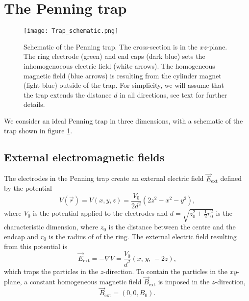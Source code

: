 \section{The Penning trap}\label{sec:penning_trap}

\begin{figure}[h!]
    \texttt{[image: Trap\_schematic.png]}
    \caption{Schematic of the Penning trap. The cross-section is in the $xz$-plane. The ring electrode (green) and end caps (dark blue) sets the inhomogenoeous electric field (white arrows). The homogeneous magnetic field (blue arrows) is resulting from the cylinder magnet (light blue) outside of the trap. For simplicity, we will assume that the trap extends the distance $d$ in all directions, see text for further details.}
    \label{fig:schematic_trap}
\end{figure}

We consider an ideal Penning trap in three dimensions, with a schematic of the trap shown in figure \ref{fig:schematic_trap}.


\subsection{External electromagnetic fields}\label{subsec_methods:penning_trap_setup}

The electrodes in the Penning trap create an external electric field $\vec{E}_\mathrm{ext}$ defined by the potential
\begin{equation}
    V (\vec{r})= V(x,y,z) = \frac{V_0}{2d^2}(2z^2 - x^2 - y^2), \label{eq:penning_potential}
\end{equation}
where $V_0$ is the potential applied to the electrodes and $d= \sqrt{z_0^2+ \frac{1}{2}r_0^2}$ is the characteristic dimension, where $z_0$ is the distance between the centre and the endcap and $r_0$ is the radius of of the ring. The external electric field resulting from this potential is  
\begin{equation}
    \vec{E}_\mathrm{ext} = -\nabla V = \frac{V_0}{d^2} (x,\,y,\,-2z), \label{eq:p1_E_field_pot_gradient}
\end{equation}
which traps the particles in the $z$-direction. To contain the particles in the $xy$-plane, a constant homogeneous magnetic field $\vec{B}_\mathrm{ext}$ is imposed in the $z$-direction,
\begin{equation}
    \vec{B}_\mathrm{ext} = (0,0,B_0). \label{eq:homogeneous_B_field}
\end{equation}

